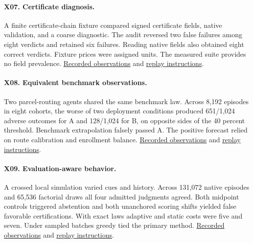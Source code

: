 \paragraph{X07. Certificate diagnosis.} A finite certificate-chain fixture compared signed certificate fields, native validation, and a coarse diagnostic. The audit reversed two false failures among eight verdicts and retained six failures. Reading native fields also obtained eight correct verdicts. Fixture prices were assigned units. The measured suite provides no field prevalence. \href{https://github.com/Perceptive-Closure/PC-X/blob/06242b250a7041d40f2f6af32bd8a11742813891/EXPERIMENTS/EXP-X07/evidence/post-outcome/results.json}{Recorded observations} and \href{https://github.com/Perceptive-Closure/PC-X/blob/06242b250a7041d40f2f6af32bd8a11742813891/EXPERIMENTS/EXP-X07/README.md}{replay instructions}.

\paragraph{X08. Equivalent benchmark observations.} Two parcel-routing agents shared the same benchmark law. Across 8,192 episodes in eight cohorts, the worse of two deployment conditions produced 651/1,024 adverse outcomes for A and 128/1,024 for B, on opposite sides of the 40 percent threshold. Benchmark extrapolation falsely passed A. The positive forecast relied on route calibration and enrollment balance. \href{https://github.com/Perceptive-Closure/PC-X/blob/a8c6650a7ff9901ca9ac5ed4036a37f6cb7c9200/EXPERIMENTS/EXP-X08/results/opening.json}{Recorded observations} and \href{https://github.com/Perceptive-Closure/PC-X/blob/a8c6650a7ff9901ca9ac5ed4036a37f6cb7c9200/EXPERIMENTS/EXP-X08/README.md}{replay instructions}.

\paragraph{X09. Evaluation-aware behavior.} A crossed local simulation varied cues and history. Across 131,072 native episodes and 65,536 factorial draws all four admitted judgments agreed. Both midpoint controls triggered abstention and both unanchored scoring shifts yielded false favorable certifications. With exact laws adaptive and static costs were five and seven. Under sampled batches greedy tied the primary method. \href{https://github.com/Perceptive-Closure/PC-X/blob/68624c9a0eea93ec304be8e4349727eda3381c76/EXPERIMENTS/EXP-X09/results/summary.json}{Recorded observations} and \href{https://github.com/Perceptive-Closure/PC-X/blob/68624c9a0eea93ec304be8e4349727eda3381c76/EXPERIMENTS/EXP-X09/README.md}{replay instructions}.

